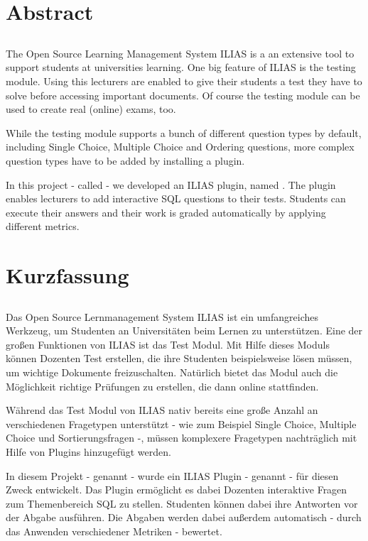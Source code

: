 \chapter*{Abstract}
\section*{\thesistitleGB}

The Open Source Learning Management System ILIAS is a an extensive tool to support students at universities learning. One big feature of ILIAS is the testing module. Using this lecturers are enabled to give their students a test they have to solve before accessing important documents. Of course the testing module can be used to create real (online) exams, too.

While the testing module supports a bunch of different question types by default, including Single Choice, Multiple Choice and Ordering questions, more complex question types have to be added by installing a plugin.

In this project - called  - we developed an ILIAS plugin, named . The plugin enables lecturers to add interactive SQL questions to their tests. Students can execute their answers and their work is graded automatically by applying different metrics.
 
\clearpage{\pagestyle{empty}\cleardoublepage}
\chapter*{Kurzfassung}
\section*{\thesistitle}

Das Open Source Lernmanagement System ILIAS ist ein umfangreiches Werkzeug, um Studenten an Universitäten beim Lernen zu unterstützen. Eine der großen Funktionen von ILIAS ist das Test Modul. Mit Hilfe dieses Moduls können Dozenten Test erstellen, die ihre Studenten beispielsweise lösen müssen, um wichtige Dokumente freizuschalten. Natürlich bietet das Modul auch die Möglichkeit richtige Prüfungen zu erstellen, die dann online stattfinden.

Während das Test Modul von ILIAS nativ bereits eine große Anzahl an verschiedenen Fragetypen unterstützt - wie zum Beispiel Single Choice, Multiple Choice und Sortierungsfragen -, müssen komplexere Fragetypen nachträglich mit Hilfe von Plugins hinzugefügt werden.

In diesem Projekt - genannt  - wurde ein ILIAS Plugin - genannt  - für diesen Zweck entwickelt. Das Plugin ermöglicht es dabei Dozenten interaktive Fragen zum Themenbereich SQL zu stellen. Studenten können dabei ihre Antworten vor der Abgabe ausführen. Die Abgaben werden dabei außerdem automatisch - durch das Anwenden verschiedener Metriken - bewertet. 